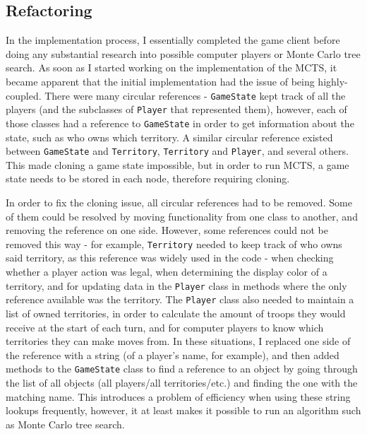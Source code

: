 \subsection{Refactoring}
\label{refactoring}

In the implementation process, I essentially completed the game client before doing any substantial research into possible computer players or Monte Carlo tree search. As soon as I started working on the implementation of the MCTS, it became apparent that the initial implementation had the issue of being highly-coupled. There were many circular references - \texttt{GameState} kept track of all the players (and the subclasses of \texttt{Player} that represented them), however, each of those classes had a reference to \texttt{GameState} in order to get information about the state, such as who owns which territory. A similar circular reference existed between \texttt{GameState} and \texttt{Territory}, \texttt{Territory} and \texttt{Player}, and several others. This made cloning a game state impossible, but in order to run MCTS, a game state needs to be stored in each node, therefore requiring cloning.

In order to fix the cloning issue, all circular references had to be removed. Some of them could be resolved by moving functionality from one class to another, and removing the reference on one side. However, some references could not be removed this way - for example, \texttt{Territory} needed to keep track of who owns said territory, as this reference was widely used in the code - when checking whether a player action was legal, when determining the display color of a territory, and for updating data in the \texttt{Player} class in methods where the only reference available was the territory. The \texttt{Player} class also needed to maintain a list of owned territories, in order to calculate the amount of troops they would receive at the start of each turn, and for computer players to know which territories they can make moves from. In these situations, I replaced one side of the reference with a string (of a player's name, for example), and then added methods to the \texttt{GameState} class to find a reference to an object by going through the list of all objects (all players/all territories/etc.) and finding the one with the matching name. This introduces a problem of efficiency when using these string lookups frequently, however, it at least makes it possible to run an algorithm such as Monte Carlo tree search.

